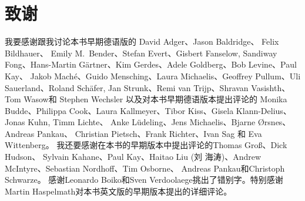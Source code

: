 \section*{致谢}

我要感谢跟我讨论本书早期德语版的
David Adger、Jason Baldridge、 Felix Bildhauer、
Emily M.\ Bender、Stefan Evert、Gisbert Fanselow, 
Sandiway Fong、Hans-Martin Gärtner、Kim Gerdes、Adele Goldberg、Bob Levine、Paul Kay、
Jakob Maché、Guido Mensching、Laura Michaelis、Geoffrey Pullum、Uli Sauerland、Roland Schäfer,
Jan Strunk、Remi van Trijp、Shravan Vasishth、Tom Wasow和
Stephen Wechsler
%
以及对本书早期德语版本提出评论的
Monika Budde、Philippa Cook、Laura Kallmeyer、Tibor Kiss、Gisela Klann-Delius、 Jonas Kuhn,
Timm Lichte、%
Anke Lüdeling、Jens Michaelis、Bjarne Ørsnes、Andreas Pankau、    %
Christian Pietsch、Frank Richter、Ivan Sag
和
Eva Wittenberg。
%
%
我还要感谢在本书的早期版本中提出评论的Thomas Groß、Dick Hudson、
Sylvain Kahane、Paul Kay、Haitao Liu (刘 海涛)、Andrew McIntyre、Sebastian Nordhoff、Tim Osborne、
Andreas Pankau和Christoph Schwarze。
感谢Leonardo Boiko和Sven Verdoolaege挑出了错别字。特别感谢Martin Haspelmath对本书英文版的早期版本提出的详细评论。

